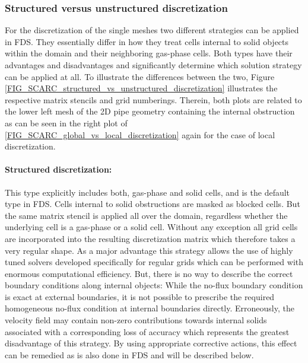 \subsubsection{Structured versus unstructured discretization}
\label{SEC_SCARC_discretization_types}

For the discretization of the single meshes two different strategies can be applied in FDS. They essentially differ in how they treat cells internal to solid objects within the domain and their neighboring gas-phase cells. Both types have their advantages and disadvantages and significantly determine which solution strategy can be applied at all. 
%
To illustrate the differences between the two, Figure \ref{FIG_SCARC_structured_vs_unstructured_discretization} illustrates the respective matrix stencils and grid numberings. Therein, both plots are related to
the lower left mesh of the 2D pipe geometry containing the internal obstruction as can be seen in the right plot of \ref{FIG_SCARC_global_vs_local_discretization} again for the case of local discretization.
\paragraph{Structured discretization:}  This type explicitly includes both, gas-phase and solid cells,
and is the default type in FDS. Cells internal to solid obstructions are masked as blocked cells. But the same matrix stencil is applied all over the domain, regardless whether the underlying cell is a gas-phase or a solid cell. Without any exception all grid cells are incorporated into the resulting discretization matrix which therefore takes a very regular shape. As a major advantage this strategy allows the use of highly tuned solvers developed specifically for regular grids which can be performed with enormous computational efficiency. But, there is no way to describe the correct boundary conditions along internal objects:
While the no-flux boundary condition is exact at external boundaries, it is not possible to prescribe the required homogeneous no-flux condition at internal boundaries directly. Erroneously, 
the velocity field may contain non-zero contributions towards internal solids
associated with a corresponding loss of accuracy which represents the greatest disadvantage of this strategy. By using appropriate corrective actions, this effect can be remedied as is also done in FDS and will be described below.

